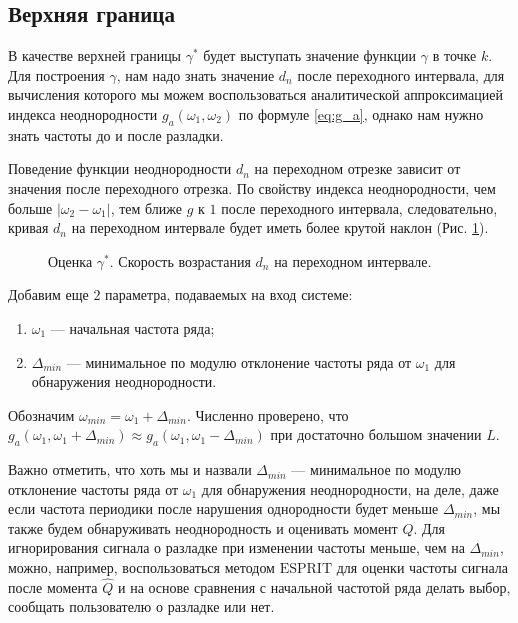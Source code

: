 \documentclass[specialist, substylefile = spbu.rtx,
			   subf, href, 12pt]{disser}
\begin{document}
\subsection{Верхняя граница}\label{ch:apper_border}
В качестве верхней границы $ \gamma^* $ будет выступать значение функции $ \gamma $ в точке $ k $. Для построения $ \gamma $, нам надо знать значение $ d_n $ после переходного интервала, для вычисления которого мы можем воспользоваться аналитической аппроксимацией индекса неоднородности $ g_a(\omega_1, \omega_2) $ по формуле \eqref{eq:g_a}, однако нам нужно знать частоты до и после разладки.

Поведение функции неоднородности $ d_n $ на переходном отрезке зависит от значения после переходного отрезка. По свойству индекса неоднородности, чем больше $ |\omega_2 - \omega_1| $, тем ближе $ g $ к $ 1 $ после переходного интервала, следовательно, кривая $ d_n $ на переходном интервале будет иметь более крутой наклон (Рис. \ref{pic:diff_omega_growth}).

\begin{figure}[!hhh]
	\caption{Оценка $ \gamma^* $. Скорость возрастания $ d_n $ на переходном интервале.}
	\label{pic:diff_omega_growth}
\end{figure}

Добавим еще $ 2 $ параметра, подаваемых на вход системе:
\begin{enumerate}
	\item $ \omega_1 $ --- начальная частота ряда;
	\item $ \Delta_{min} $ --- минимальное по модулю отклонение частоты ряда от $ \omega_1 $ для обнаружения неоднородности.
\end{enumerate}

Обозначим $ \omega_{min} = \omega_1 + \Delta_{min}$. Численно проверено, что $ g_a(\omega_1, \omega_1 + \Delta_{min}) \approx g_a(\omega_1, \omega_1 - \Delta_{min}) $ при достаточно большом значении $ L $.

Важно отметить, что хоть мы и назвали $ \Delta_{min} $ --- минимальное по модулю отклонение частоты ряда от $ \omega_1 $ для обнаружения неоднородности, на деле, даже если частота периодики после нарушения однородности будет меньше $ \Delta_{min} $, мы также будем обнаруживать неоднородность и оценивать момент $ Q $. Для игнорирования сигнала о разладке при изменении частоты меньше, чем на $ \Delta_{min} $, можно, например, воспользоваться методом $ \mathrm{ESPRIT} $ \cite{epsrit} для оценки частоты сигнала после момента $ \hat{Q} $ и на основе сравнения с начальной частотой ряда делать выбор, сообщать пользователю о разладке или нет.
\end{document}
